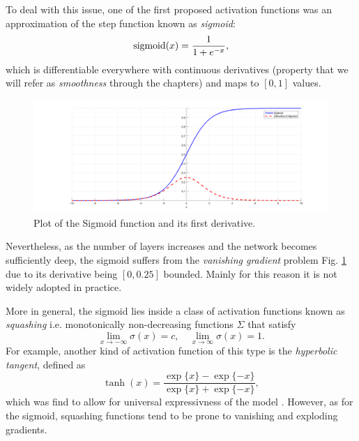 \documentclass[LaM,binding=0.6cm]{./packages/sapthesis/sapthesis}
\begin{document}
            To deal with this issue, one of the first proposed activation functions was an approximation of the step function known as \textit{sigmoid}: 
            \begin{equation}
                \textnormal{sigmoid}(x) = \frac{1}{1 + e^{-x}},
            \end{equation}
            which is differentiable everywhere with continuous derivatives (property that we will refer as \textit{smoothness} through the chapters) and
            maps to $ [0, 1] $ values.
            \begin{figure}[h]
                \centering
                \includegraphics[width=1\textwidth]{sig_der}
                \caption{Plot of the Sigmoid function and its first derivative.}
                \label{fig:sigmoid}
            \end{figure}
            Nevertheless, as the number of layers increases and the network becomes sufficiently deep, the sigmoid suffers from the \textit{vanishing gradient} problem \cite{expvangrads} Fig. \ref{fig:sigmoid}
            due to its derivative being $[0, 0.25]$ bounded. Mainly for this reason it is not widely adopted in practice.

            More in general, the sigmoid lies inside a class of activation functions known as \textit{squashing} i.e. monotonically non-decreasing functions $\varSigma$
            that satisfy
            \begin{equation}
                \lim_{x \to - \infty} \sigma(x) = c, \quad 
                \lim_{x \to \infty} \sigma(x) = 1.
            \end{equation}
            For example, another kind of activation function of this type is the \textit{hyperbolic tangent}, defined as
            \begin{equation}
                \tanh (x)=\frac{\exp \{x\}-\exp \{-x\}}{\exp \{x\}+\exp \{-x\}},
            \end{equation}
            which was find to allow for universal expressivness of the model \cite{hypertanh}. However, as for the sigmoid, squashing functions tend to be prone to vanishing 
            and exploding gradients.
\end{document}
